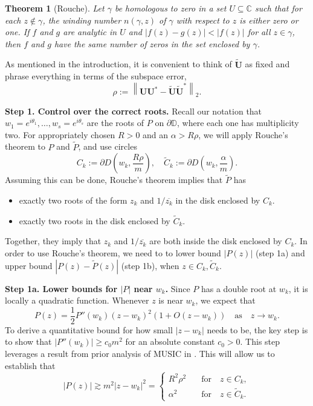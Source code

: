 \documentclass[11pt]{article}
\newtheorem{theorem}{Theorem}
\theoremstyle{definition}
\numberwithin{theorem}{section}
\numberwithin{equation}{section}
\def\C{\mathbb{C}}
\def\D{\mathbb{D}}
\renewcommand{\subset}{\subseteq}
\renewcommand{\tilde}{\widetilde}
\newcommand{\bfU}{{\boldsymbol U}}
\def\forspace{\quad\text{for}\quad}
\numberwithin{equation}{section}
\begin{document}
\begin{theorem}[Rouche] \label{thm:rouche}
	Let $\gamma$ be homologous to zero in a set $U\subset \C$ such that for each $z\not\in \gamma$, the winding number $n(\gamma,z)$ of $\gamma$ with respect to $z$ is either zero or one. If $f$ and $g$ are analytic in $U$ and $|f(z)-g(z)|<|f(z)|$ for all $z\in \gamma$, then $f$ and $g$ have the same number of zeros in the set enclosed by $\gamma$. 
\end{theorem}

As mentioned in the introduction, it is convenient to think of $\tilde \bfU$ as fixed and phrase everything in terms of the subspace error,
$$
\rho
:= \left\|\bfU\bfU^*- \tilde \bfU \tilde\bfU^* \right\|_2.
$$

{\bf Step 1. Control over the correct roots.} Recall our notation that $w_1=e^{i\theta_1},\dots,w_s=e^{i\theta_s}$ are the roots of $P$ on $\partial \D$, where each one has multiplicity two. For appropriately chosen $R>0$ and an $\alpha > R\rho$, we will apply Rouche's theorem to $P$ and $\tilde P$, and use circles 
$$
C_k:=\partial D\left(w_k, \frac{R\rho} m\right), \quad \tilde C_k:=\partial D\left(w_k, \frac{\alpha} m\right). 
$$
Assuming this can be done,  Rouche's theorem implies that $\tilde P$ has 
\begin{itemize}
    \item 
    exactly two roots of the form $z_k$ and $1/\overline{z_k}$ in the disk enclosed by $C_k$.
    \item 
    exactly two roots in the disk enclosed by $\tilde C_k$. 
\end{itemize}
Together, they imply that $z_k$ and $1/\overline{z_k}$ are both inside the disk enclosed by $C_k$. In order to use Rouche's theorem, we need to to lower bound $|P(z)|$ (step 1a) and upper bound $|P(z)-\tilde P(z)|$ (step 1b), when $z\in C_k, \tilde C_k$. 

{\bf Step 1a. Lower bounds for $|P|$ near $w_k$.} Since $P$ has a double root at $w_k$, it is locally a quadratic function. Whenever $z$ is near $w_k$, we expect that  
$$
P(z)= \frac 12 P''(w_k)(z-w_k)^2 \left( 1+O(z-w_k)\right) \quad \text{as} \quad z\to w_k.
$$
To derive a quantitative bound for how small $|z-w_k|$ needs to be, the key step is to show that 
$
|P''(w_k)|\geq c_0 m^2
$
for an absolute constant $c_0>0$. This step leverages a result from prior analysis of MUSIC in \cite{fannjiang2025optimality}. This will allow us to establish that
\begin{equation}
    \label{eq:Plower0}
    |P(z)|
    \gtrsim m^2 |z-w_k|^2
    = \begin{cases}
        R^2 \rho^2 &\forspace z\in C_k, \\
         \alpha^2 &\forspace z\in \tilde C_k. 
    \end{cases}
\end{equation}
 
\end{document}

